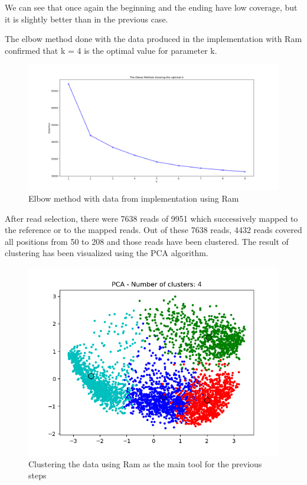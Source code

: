 \documentclass[times, utf8, zavrsni, numeric]{fer}
\begin{document}
We can see that once again the beginning and the ending have low coverage, but it is
slightly better than in the previous case. 

The elbow method done with the data produced in the implementation with Ram confirmed 
that k = 4 is the optimal value for parameter k. 

\begin{figure}[H]
    \centering
    \includegraphics[width=\linewidth]{figures/elbow_process_ram}
    \caption{Elbow method with data from implementation using Ram}
    \label{fig:elbowRam}
\end{figure}

After read selection, there were 7638 reads of 9951 which successively mapped to 
the reference or to the mapped reads. Out of these 7638 reads, 4432 reads covered
all positions from 50 to 208 and those reads have been clustered. The result of 
clustering has been visualized using the PCA algorithm.

\begin{figure}[H]
    \centering
    \includegraphics[width=\linewidth]{figures/ram_final_graphmap_PCA_4}
    \caption{Clustering the data using Ram as the main tool for the previous steps}
    \label{fig:clustersRam}
\end{figure}
\end{document}
